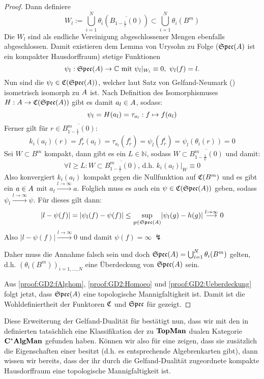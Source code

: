 \begin{proof}
Dann definiere 
\[W_l := \bigcup_{i=1}^N \theta_i(\overline{B_{1-\frac{1}{l}}(0)}) \subset \bigcup_{i=1}^N \theta_i(B^m)\]
Die $W_l$ sind als endliche Vereinigung abgeschlossener Mengen ebenfalls abgeschlossen. Damit existieren dem Lemma von Urysohn zu Folge ($\mathfrak{Spec}(A)$ ist ein kompakter Hausdorffraum) stetige Funktionen
\[\psi_l: \mathfrak{Spec}(A) \to \mathbb{C} \text{ mit } \psi_l|_{W_l} \equiv 0, ~\psi_l(f) = l.\]
Nun sind die $\psi_l \in \mathfrak{C}(\mathfrak{Spec}(A))$, welcher laut Satz von Gelfand-Neumark () isometrisch isomorph zu $A$ ist. Nach Definition des Isomorphismuses $H: A \to  \mathfrak{C}(\mathfrak{Spec}(A))$ gibt es damit $a_l \in A$, sodass:
\[\psi_l = H(a_l) = \tau_{a_l}: f \mapsto f(a_l)\]
Ferner gilt für $r \in \overline{B_{1-\frac{1}{l}}^m(0)}$:
\[k_i(a_l)(r) = f_r^i(a_l) = \tau_{a_l}(f_r^i) = \psi_l(f_r^i) = \psi_l(\theta_i(r)) = 0\]
Sei $W \subset B^m$ kompakt, dann gibt es ein $L \in \mathbb{N}$, sodass $W \subset \overline{B_{1-\frac{1}{L}}^m(0)}$ und damit:
\[\forall l \geq L: W \subset \overline{B_{1-\frac{1}{l}}^m(0)} \text{, d.h. } k_i(a_l)|_W \equiv 0\]
Also konvergiert $k_i(a_l)$ kompakt gegen die Nullfunktion auf $\mathfrak{C}(B^m)$ und es gibt ein $a \in A$ mit $a_l \overset{l \to \infty}{\longrightarrow} a$. Folglich muss es auch ein $\psi \in \mathfrak{C}(\mathfrak{Spec}(A))$ geben, sodass $\psi_l \overset{l \to \infty}{\longrightarrow} \psi$. Für dieses gilt dann:
\[|l - \psi(f)| = |\psi_l(f) - \psi(f)| \leq \underset{g \in \mathfrak{Spec}(A)}{\sup}|\psi_l(g) - h(g)| \overset{l \to \infty}{\longrightarrow} 0 \]
Also $|l - \psi(f)| \overset{l \to \infty}{\longrightarrow} 0$ und damit $\psi(f) = \infty ~\lightning$

Daher muss die Annahme falsch sein und doch $\mathfrak{Spec}(A) = \bigcup_{i=1}^N \theta_i(B^m)$ gelten, d.h. $(\theta_i(B^m))_{i=1,\dots,N}$ eine Überdeckung von $\mathfrak{Spec}(A)$ sein.

Aus \ref{proof:GD2:fAlghom}, \ref{proof:GD2:Homoeo} und \ref{proof:GD2:Ueberdeckung} folgt jetzt, dass $\mathfrak{Spec}(A)$ eine topologische Mannigfaltigkeit ist. Damit ist die Wohldefiniertheit der Funktoren $\mathfrak{C}$ und $\mathfrak{Spec}$ für  gezeigt.
\end{proof}

Diese Erweiterung der Gelfand-Dualität für \komTopMann{} bestätigt nun, dass wir mit den in  definierten \CAlgMann{} tatsächlich eine Klassifikation der zu $\mathbf{TopMan}$ dualen Kategorie $\mathbf{C^*AlgMan}$ gefunden haben. Können wir also für eine \CAlg{} zeigen, dass sie zusätzlich die Eigenschaften einer \CAlgMan{} besitzt (d.h. es entsprechende Algebrenkarten gibt), dann wissen wir bereits, dass der ihr durch die Gelfand-Dualität zugeordnete kompakte Hausdorffraum eine topologische Mannigfaltigkeit ist.